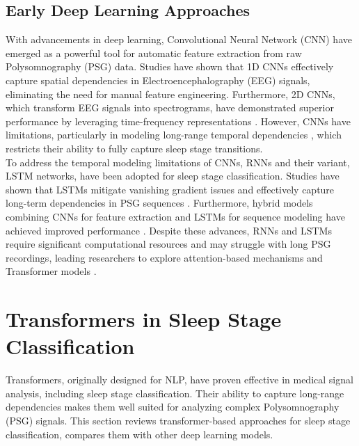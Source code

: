 \subsection{Early Deep Learning Approaches}

With advancements in deep learning, Convolutional Neural Network (CNN) have emerged as a powerful tool for automatic feature extraction from raw Polysomnography (PSG) data. Studies have shown that 1D \acp{CNN} effectively capture spatial dependencies in Electroencephalography (EEG) signals, eliminating the need for manual feature engineering. Furthermore, 2D \acp{CNN}, which transform \acs{EEG} signals into spectrograms, have demonstrated superior performance by leveraging time-frequency representations \parencite{biswal2018expert}. However, \acp{CNN} have limitations, particularly in modeling long-range temporal dependencies \parencite{phan2018joint}, which restricts their ability to fully capture sleep stage transitions. \\

To address the temporal modeling limitations of \acp{CNN}, \acp{RNN} and their variant, \ac{LSTM} networks, have been adopted for sleep stage classification.  Studies have shown that \acp{LSTM} mitigate vanishing gradient issues and effectively capture long-term dependencies in \acs{PSG} sequences \parencite{supratak2017deepsleepnet}. Furthermore, hybrid models combining \acp{CNN} for feature extraction and \acp{LSTM} for sequence modeling have achieved improved performance \parencite{chambon2018deep}. Despite these advances, \acp{RNN} and \acp{LSTM} require significant computational resources and may struggle with long \acs{PSG} recordings, leading researchers to explore attention-based mechanisms and Transformer models \parencite{vaswani2017attention}.

\section{Transformers in Sleep Stage Classification}
\label{lit:2}

Transformers, originally designed for \ac{NLP}, have proven effective in medical signal analysis, including sleep stage classification. Their ability to capture long-range dependencies makes them well suited for analyzing complex Polysomnography (PSG) signals. This section reviews transformer-based approaches for sleep stage classification, compares them with other deep learning models.


